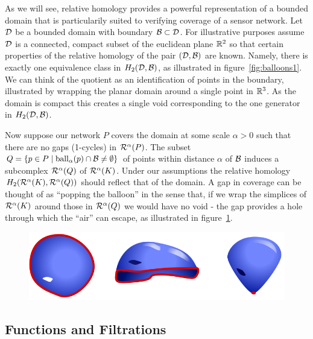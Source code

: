As we will see, relative homology provides a powerful representation of a bounded domain that is particularily suited to verifying coverage of a sensor network.
Let ${\mathcal{D}}$ be a bounded domain with boundary ${\mathcal{B}}\subset{\mathcal{D}}$.
For illustrative purposes assume ${\mathcal{D}}$ is a connected, compact subset of the euclidean plane $\mathbb{R}^2$ so that certain properties of the relative homology of the pair $({\mathcal{D}}, {\mathcal{B}})$ are known.
Namely, there is exactly one equivalence class in $H_2({\mathcal{D}}, {\mathcal{B}})$, as illustrated in figure~\ref{fig:balloons1}.
We can think of the quotient as an identification of points in the boundary, illustrated by wrapping the planar domain around a single point in $\mathbb{R}^3$.
As the domain is compact this creates a single void corresponding to the one generator in $H_2({\mathcal{D}}, {\mathcal{B}})$.

Now suppose our network $P$ covers the domain at some scale $\alpha > 0$ such that there are no gaps (1-cycles) in $\mathcal{R}^\alpha(P)$.
The subset $Q = \{p\in P\mid \mathrm{ball}_\alpha(p)\cap{\mathcal{B}}\neq\emptyset\}$ of points within distance $\alpha$ of ${\mathcal{B}}$ induces a subcomplex $\mathcal{R}^\alpha(Q)$ of $\mathcal{R}^\alpha(K)$.
Under our assumptions the relative homology $H_2(\mathcal{R}^\alpha(K), \mathcal{R}^\alpha(Q))$ should reflect that of the domain.
A gap in coverage can be thought of as ``popping the balloon'' in the sense that, if we wrap the simplices of $\mathcal{R}^\alpha(K)$ around those in $\mathcal{R}^\alpha(Q)$ we would have no void - the gap provides a hole through which the ``air'' can escape, as illustrated in figure~\ref{fig:balloons2}.

\begin{figure}[htbp]
\centering
    \includegraphics[scale=0.5]{figures/balloons2.png}
    \caption{}
    \label{fig:balloons2}
\end{figure}

\subsection{Functions and Filtrations}

